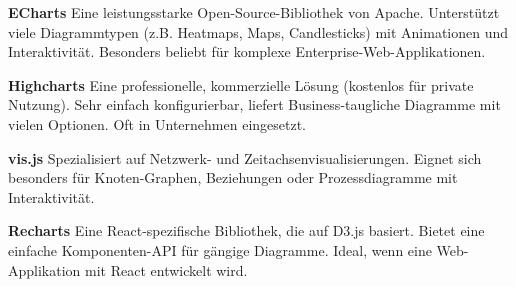 \textbf{ECharts}
Eine leistungsstarke Open-Source-Bibliothek von Apache. Unterstützt viele
Diagrammtypen (z.B. Heatmaps, Maps, Candlesticks) mit Animationen und
Interaktivität. Besonders beliebt für komplexe Enterprise-Web-Applikationen.

\textbf{Highcharts}
Eine professionelle, kommerzielle Lösung (kostenlos für private Nutzung).
Sehr einfach konfigurierbar, liefert Business-taugliche Diagramme mit vielen
Optionen. Oft in Unternehmen eingesetzt.

\textbf{vis.js}
Spezialisiert auf Netzwerk- und Zeitachsenvisualisierungen. Eignet sich
besonders für Knoten-Graphen, Beziehungen oder Prozessdiagramme mit
Interaktivität.

\textbf{Recharts}
Eine React-spezifische Bibliothek, die auf D3.js basiert.
Bietet eine einfache Komponenten-API für gängige Diagramme.
Ideal, wenn eine Web-Applikation mit React entwickelt wird.


